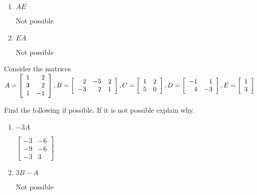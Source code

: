 \documentclass{ximera}
\begin{document}
\begin{problem}
\begin{enumerate}
\item $AE$

\begin{hint}
Not possible
\end{hint}

\item $EA$

\begin{hint}
Not possible
\end{hint}

\end{enumerate}
\end{problem}

\begin{problem}\label{prb:4.10} Consider the matrices $
A =\left[
\begin{array}{rr}
1 & 2 \\
3 & 2 \\
1 & -1
\end{array}
\right], B=\left[
\begin{array}{rrr}
2 & -5 & 2 \\
-3 & 2 & 1
\end{array}
\right] ,
C =\left[
\begin{array}{rr}
1 & 2 \\
5 & 0
\end{array}
\right], \\ D=\left[
\begin{array}{rr}
-1 & 1 \\
4 & -3
\end{array}
\right], E=\left[
\begin{array}{r}
1 \\
3
\end{array}
\right]$

Find the following if possible. If it is not possible explain
why.
\begin{enumerate}
\item $-3A$

\begin{hint}
$\left[
\begin{array}{rr}
-3 & -6 \\
-9 & -6 \\
-3 & 3
\end{array}
\right]$
\end{hint}

\item $3B-A$

\begin{hint}
Not possible
\end{hint}


\end{enumerate}
\end{problem}
\end{document}

